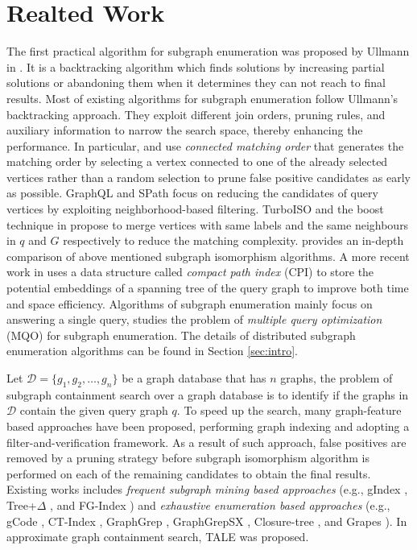 \section{Realted Work}
\label{sec:rel}

 The first practical algorithm for subgraph enumeration was proposed by Ullmann in \cite{Ullmann1976}. It is a backtracking algorithm which finds solutions by increasing partial solutions or abandoning them when it determines they can not reach to final results. Most of existing algorithms for subgraph enumeration follow Ullmann's backtracking approach. They exploit different join orders, pruning rules, and auxiliary information to narrow the search space, thereby enhancing the performance. In particular, \vftwo \cite{cordella2004sub} and \quicksi \cite{Shang2008} use \textit{connected matching order} that generates the matching order by selecting a vertex connected to one of the already selected vertices rather than a random selection to prune false positive candidates as early as possible. GraphQL \cite{graph-ql} and SPath \cite{spath} focus on reducing the candidates of query vertices by exploiting neighborhood-based filtering. TurboISO \cite{turbo-iso} and the boost technique in \cite{subgraph-boost} propose to merge vertices with same labels and the same neighbours in $q$ and $G$ respectively to reduce the matching complexity. \cite{comparison} provides an in-depth comparison of above mentioned subgraph isomorphism algorithms. A more recent work in \cite{bi-fei} uses a data structure called \textit{compact path index} (CPI) to store the potential embeddings of a spanning tree of the query graph to improve both time and space efficiency. Algorithms of subgraph enumeration mainly focus on answering a single query, \cite{multi-query} studies the problem of \textit{multiple query optimization} (MQO) for subgraph enumeration. The details of distributed subgraph enumeration algorithms can be found in Section \ref{sec:intro}.

 Let $\mathcal{D}=\{g_1,g_2,\dots,g_n\}$ be a graph database that has $n$ graphs, the problem of subgraph containment search over a graph database is to identify if the graphs in $\mathcal{D}$ contain the given query graph $q$. To speed up the search, many graph-feature based approaches have been proposed, performing graph indexing and adopting a filter-and-verification framework. As a result of such approach, false positives are removed by a pruning strategy before subgraph isomorphism algorithm is performed on each of the remaining candidates to obtain the final results. Existing works includes \textit{frequent subgraph mining based approaches} (e.g., gIndex \cite{gindex}, Tree+$\Delta$ \cite{tree+}, and FG-Index \cite{fg-index}) and \textit{exhaustive enumeration based approaches} (e.g., gCode \cite{gcode}, CT-Index \cite{ct-index}, GraphGrep \cite{graph-grep}, GraphGrepSX \cite{graph-grep-sx}, Closure-tree \cite{closure-tree}, and Grapes \cite{grapes}). In approximate graph containment search, TALE \cite{tale} was proposed.